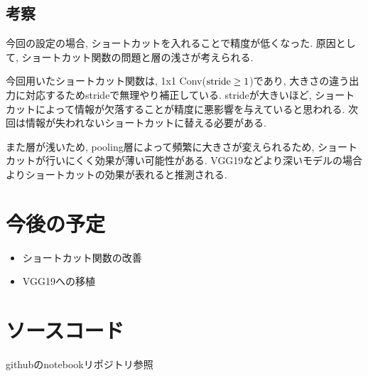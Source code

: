 \documentclass[twocolumn]{jarticle}     %
\begin{document}
\subsection{考察}
今回の設定の場合, ショートカットを入れることで精度が低くなった.
原因として, ショートカット関数の問題と層の浅さが考えられる.

今回用いたショートカット関数は, 1x1 Conv($\rm{stride} \geq 1$)であり, 大きさの違う出力に対応するためstrideで無理やり補正している. strideが大きいほど, ショートカットによって情報が欠落することが精度に悪影響を与えていると思われる.
次回は情報が失われないショートカットに替える必要がある.

また層が浅いため, pooling層によって頻繁に大きさが変えられるため, ショートカットが行いにくく効果が薄い可能性がある. VGG19などより深いモデルの場合よりショートカットの効果が表れると推測される.

\section{今後の予定}

\begin{itemize}
  \item ショートカット関数の改善
  \item VGG19への移植
\end{itemize}

\section{ソースコード}
githubのnotebookリポジトリ参照



\end{document}
